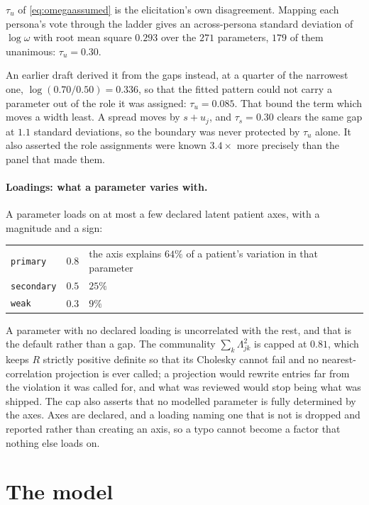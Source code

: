 \documentclass[11pt]{article}
\begin{document}
$\tau_u$ of \eqref{eq:omegaassumed} is the elicitation's own disagreement.
Mapping each persona's vote through the ladder gives an across-persona standard
deviation of $\log\omega$ with root mean square $0.293$ over the $271$
parameters, $179$ of them unanimous: $\tau_u = 0.30$.

An earlier draft derived it from the gaps instead, at a quarter of the narrowest
one, $\log(0.70/0.50)=0.336$, so that the fitted pattern could not carry a
parameter out of the role it was assigned: $\tau_u = 0.085$. That bound the term
which moves a width least. A spread moves by $s + u_j$, and $\tau_s = 0.30$
clears the same gap at $1.1$ standard deviations, so the boundary was never
protected by $\tau_u$ alone. It also asserted the role assignments were known
$3.4\times$ more precisely than the panel that made them.

\paragraph{Loadings: what a parameter varies with.} A parameter loads on at most
a few declared latent patient axes, with a magnitude and a sign:
\begin{center}\small
\begin{tabularx}{0.95\textwidth}{@{}llX@{}}
\toprule
\texttt{primary} & $0.8$ & the axis explains $64\%$ of a patient's variation in that parameter \\
\texttt{secondary} & $0.5$ & $25\%$ \\
\texttt{weak} & $0.3$ & $9\%$ \\
\bottomrule
\end{tabularx}
\end{center}
A parameter with no declared loading is uncorrelated with the rest, and that is
the default rather than a gap. The communality $\sum_k \Lambda_{jk}^2$ is capped
at $0.81$, which keeps $R$ strictly positive definite so that its Cholesky cannot
fail and no nearest-correlation projection is ever called; a projection would
rewrite entries far from the violation it was called for, and what was reviewed
would stop being what was shipped. The cap also asserts that no modelled
parameter is fully determined by the axes. Axes are declared, and a loading
naming one that is not is dropped and reported rather than creating an axis, so a
typo cannot become a factor that nothing else loads on.

\section{The model}
\end{document}
